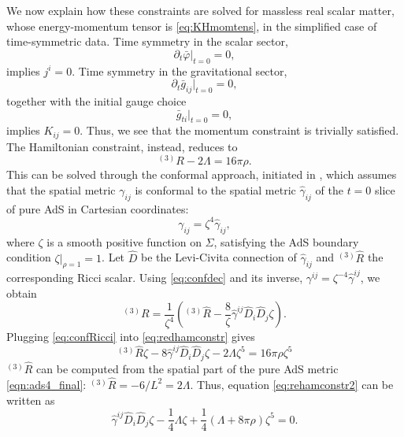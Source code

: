\documentclass[a4paper,11pt]{article}
\numberwithin{equation}{section}
\begin{document}
We now explain how these constraints are solved for massless real scalar matter, whose energy-momentum tensor is \eqref{eq:KHmomtens}, in the simplified case of time-symmetric data. Time symmetry in the scalar sector,
\begin{equation}
\partial_t \bar{\varphi}\big|_{t=0}=0,
\end{equation}
implies $j^i=0$. Time symmetry in the gravitational sector,
\begin{equation}
\partial_t \bar{g}_{ij}\big|_{t=0}=0,
\end{equation}
together with the initial gauge choice
\begin{equation}
\bar{g}_{ti}\big|_{t=0}=0,
\end{equation}
implies $K_{ij}=0$. Thus, we see that the momentum constraint is trivially satisfied.
The Hamiltonian constraint, instead, reduces to
\begin{equation}
\label{eq:redhamconstr}
^{(3)}R-2\Lambda=16\pi\rho.
\end{equation}
This can be solved through the conformal approach, initiated in \cite{Lichnerowicz:1994}, which assumes that the spatial metric $\gamma_{ij}$ is conformal to the spatial metric $\hat{\gamma}_{ij}$ of the $t=0$ slice of pure AdS in Cartesian coordinates:
\begin{equation}
\label{eq:confdec}
\gamma_{ij}=\zeta^4 \hat{\gamma}_{ij},
\end{equation}
where $\zeta$ is a smooth positive function on $\Sigma$, satisfying the AdS boundary condition $\zeta|_{\rho=1}=1$. Let $\hat{D}$ be the Levi-Civita connection of $\hat{\gamma}_{ij}$ and $^{(3)}\hat{R}$ the corresponding Ricci scalar. Using \eqref{eq:confdec} and its inverse, $\gamma^{ij}=\zeta^{-4} \hat{\gamma}^{ij}$, we obtain
\begin{equation}
\label{eq:confRicci}
^{(3)}R=\frac{1}{\zeta^4}\left(^{(3)}\hat{R}-\frac{8}{\zeta}\hat{\gamma}^{ij}\hat{D}_i \hat{D}_j \zeta\right).
\end{equation}
Plugging \eqref{eq:confRicci} into \eqref{eq:redhamconstr} gives
\begin{equation}
\label{eq:rehamconstr2}
^{(3)}\hat{R}\zeta-8\hat{\gamma}^{ij}\hat{D}_i \hat{D}_j \zeta-2\Lambda \zeta^5=16\pi\rho \zeta^5
\end{equation}
$^{(3)}\hat{R}$ can be computed from the spatial part of the pure AdS metric \eqref{eqn:ads4_final}: $^{(3)}\hat{R}=-6/L^2=2\Lambda$. Thus, equation \eqref{eq:rehamconstr2} can be written as
\begin{equation}
\label{eq:rehamconstr3}
\hat{\gamma}^{ij}\hat{D}_i \hat{D}_j \zeta-\frac{1}{4}\Lambda\zeta+\frac{1}{4}(\Lambda+8\pi\rho)\zeta^5=0.
\end{equation}
\end{document}
